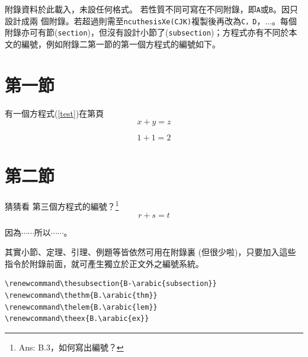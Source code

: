 
\begin{appendA}

\end{appendA}


\begin{appendB}

附錄資料於此載入，未設任何格式。
若性質不同可寫在不同附錄，即{\tt A}或{\tt B}。因只設計成兩
個附錄。若超過則需至{\tt ncuthesisXe(CJK)}複製後再改為{\tt C，D}，...。每個附錄亦可有節({\tt section})，但沒有設計小節了({\tt subsection})；方程式亦有不同於本文的編號，例如附錄二第一節的第一個方程式的編號如下。


\section{第一節}
有一個方程式(\ref{test})在第\pageref{test}頁
\begin{equation}
x+y=z  \label{test}
\end{equation}

\begin{equation}
1+1=2 
\end{equation}


\section{第二節}
猜猜看 第三個方程式的編號？\footnote{Ans: B.3，如何寫出編號？}
\[
r+s=t  \nonumber
\]
\renewcommand\thethm{B.\arabic{thm}}  
\begin{thm}[附錄中之定理]
因為$\cdots\cdots$所以$\cdots\cdots$。
\end{thm}

其實小節、定理、引理、例題等皆依然可用在附錄裏 (但很少啦)，只要加入這些指令於附錄前面，就可產生獨立於正文外之編號系統。

\begin{verbatim}
\renewcommand\thesubsection{B-\arabic{subsection}}  
\renewcommand\thethm{B.\arabic{thm}}  
\renewcommand\thelem{B.\arabic{lem}}  
\renewcommand\theex{B.\arabic{ex}} 
\end{verbatim}


\end{appendB}
